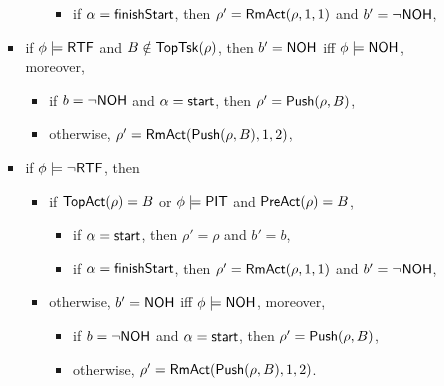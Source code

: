 \begin{itemize}
\begin{itemize}
\begin{itemize}
\begin{itemize}
\begin{itemize}
					\item if $\alpha = {\mathsf{finishStart} }$, then $\rho' = \mathsf{RmAct}(\rho, 1, 1)$ and $b' = \neg{\sf NOH}$,
				\end{itemize}
			\end{itemize}
			\item if $\phi \models {\sf RTF}$ and $B \notin \mathsf{TopTsk}(\rho)$, then $b' = {\sf NOH}$ iff $\phi \models {\sf NOH}$, moreover,
			\begin{itemize}
				\item if $b = \neg {\sf NOH}$ and $\alpha = {\mathsf{start} }$, then $\rho' = \mathsf{Push}(\rho, B)$, 
				\item otherwise, $\rho' = \mathsf{RmAct}( \mathsf{Push}(\rho, B), 1, 2)$, 
			\end{itemize}
			\item if $\phi \models \neg {\sf RTF}$, then
			\begin{itemize}
				\item if $\mathsf{TopAct}(\rho) = B$ or $\phi \models {\sf PIT}$ and $\mathsf{PreAct}(\rho) = B$, 
				\begin{itemize}
					\item if $\alpha = {\mathsf{start} }$, then $\rho' = \rho$ and $b' = b$,
					\item if $\alpha = {\mathsf{finishStart} }$, then $\rho' = \mathsf{RmAct}(\rho, 1, 1)$ and $b' = \neg{\sf NOH}$,
				\end{itemize}
				\item otherwise, $b' = {\sf NOH}$ iff $\phi \models {\sf NOH}$, moreover,
				\begin{itemize}
					\item if $b = \neg {\sf NOH}$ and $\alpha = {\mathsf{start} }$, then $\rho' = \mathsf{Push}(\rho, B)$, 
					\item otherwise, $\rho' = \mathsf{RmAct}( \mathsf{Push}(\rho, B), 1, 2)$. 
				\end{itemize}
			\end{itemize}
		\end{itemize}
\end{itemize}


\end{itemize}
